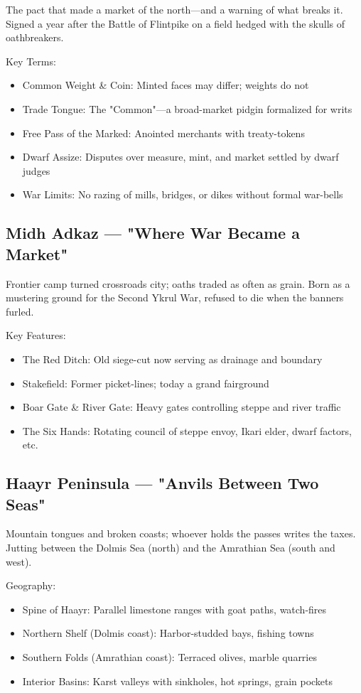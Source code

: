 The pact that made a market of the north—and a warning of what breaks it. Signed a year after the Battle of Flintpike on a field hedged with the skulls of oathbreakers.

Key Terms:
\begin{itemize}
    \item Common Weight \& Coin: Minted faces may differ; weights do not
    \item Trade Tongue: The "Common"—a broad-market pidgin formalized for writs
    \item Free Pass of the Marked: Anointed merchants with treaty-tokens
    \item Dwarf Assize: Disputes over measure, mint, and market settled by dwarf judges
    \item War Limits: No razing of mills, bridges, or dikes without formal war-bells
\end{itemize}

\subsection{Midh Adkaz — "Where War Became a Market"}
\label{sec:midhadkaz}

Frontier camp turned crossroads city; oaths traded as often as grain. Born as a mustering ground for the Second Ykrul War, refused to die when the banners furled.

Key Features:
\begin{itemize}
    \item The Red Ditch: Old siege-cut now serving as drainage and boundary
    \item Stakefield: Former picket-lines; today a grand fairground
    \item Boar Gate \& River Gate: Heavy gates controlling steppe and river traffic
    \item The Six Hands: Rotating council of steppe envoy, Ikari elder, dwarf factors, etc.
\end{itemize}

\subsection{Haayr Peninsula — "Anvils Between Two Seas"}
\label{sec:haayr}

Mountain tongues and broken coasts; whoever holds the passes writes the taxes. Jutting between the Dolmis Sea (north) and the Amrathian Sea (south and west).

Geography:
\begin{itemize}
    \item Spine of Haayr: Parallel limestone ranges with goat paths, watch-fires
    \item Northern Shelf (Dolmis coast): Harbor-studded bays, fishing towns
    \item Southern Folds (Amrathian coast): Terraced olives, marble quarries
    \item Interior Basins: Karst valleys with sinkholes, hot springs, grain pockets
\end{itemize}

